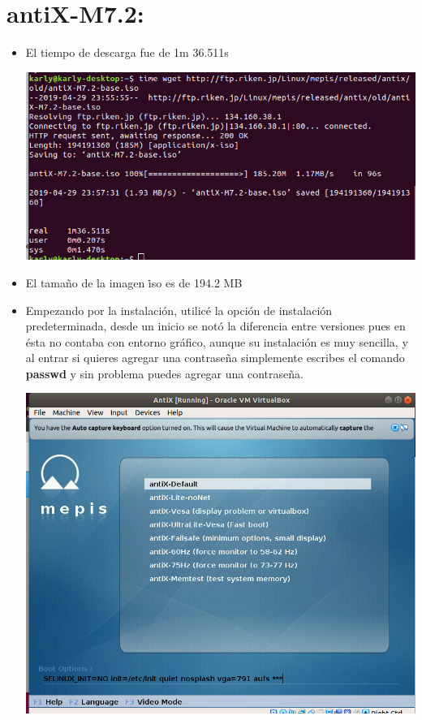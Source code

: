\documentclass[a4paper, 11pt, oneside]{article}
\begin{document}
\section*{antiX-M7.2:}
\begin{itemize}
    \item El tiempo de descarga fue de 1m 36.511s
    \begin{center}
        \includegraphics[scale=0.45]{antix2.png}
    \end{center}
    \item El tamaño de la imagen \.iso es de 194.2 MB
    \item Empezando por la instalación, utilicé la opción de instalación predeterminada, desde un inicio se notó la diferencia entre versiones pues en ésta no contaba con entorno gráfico, aunque su instalación es muy sencilla, y al entrar si quieres agregar una contraseña simplemente escribes el comando \textbf{passwd} y sin problema puedes agregar una contraseña.
    
    \begin{center}
        \includegraphics[scale=0.40]{instalacion1.png}
    \end{center}
    

\end{itemize}
\end{document}
